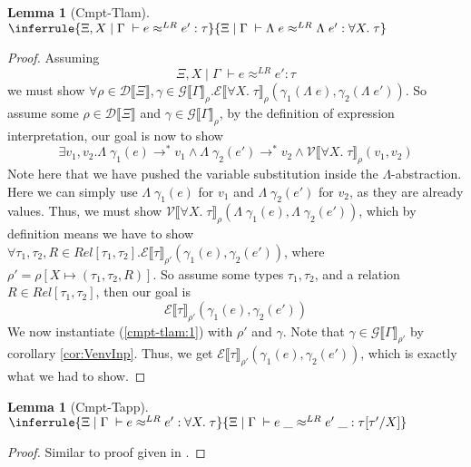 \documentclass[twoside,11pt,openright]{report}
\newtheorem{lemma}[theorem]{Lemma}
\theoremstyle{definition}
\newcommand{\expr}{e}
\newcommand{\val}{v}
\newcommand{\Tvar}{X}
\newcommand{\Tlam}{\Lambda\;}
\newcommand{\Tapp}[1]{#1\;\_}
\newcommand{\subst}[3]{#1{\left[#3 \middle/ #2 \right]}}
\newcommand{\Tall}[2]{\forall #1.\; #2}
\newcommand{\typ}{\tau}
\newcommand{\venv}{\Gamma}
\newcommand{\tenv}{\Xi}
\newcommand{\jdgRel}[6]{#1 \; | \; #2 \; \vdash #3 \approx^{#4} #5 : #6}
\newcommand{\stepS}{\rightarrow^*}
\newcommand{\ValInp}[2]{\mathcal{V} \llbracket #1 \rrbracket_{#2}}
\newcommand{\ExpInp}[2]{\mathcal{E} \llbracket #1 \rrbracket_{#2}}
\newcommand{\VenvInp}[2]{\mathcal{G} \llbracket #1 \rrbracket_{#2}}
\newcommand{\TenvInp}[1]{\mathcal{D} \llbracket #1 \rrbracket}
\newcommand{\LogRel}[5]{\jdgRel{#1}{#2}{#3}{LR}{#4}{#5}}
\newcommand{\map}[2]{#1 \mapsto #2}
\begin{document}
\begin{lemma}[Cmpt-Tlam]
  $\inferrule
  { \LogRel{\tenv, \Tvar}{\venv}{\expr}{\expr'}{\typ} }
  { \LogRel{\tenv}{\venv}{\Tlam{\expr}}{\Tlam{\expr'}}{\Tall{\Tvar}{\typ}} }$
\end{lemma}
\begin{proof}
  Assuming
  \begin{equation}\label{cmpt-tlam:1}
    \LogRel{\tenv, \Tvar}{\venv}{\expr}{\expr'}{\typ}
  \end{equation}
  we must show
  $\forall \rho \in \TenvInp{\tenv}, \gamma \in \VenvInp{\venv}{\rho} . \ExpInp{\Tall{\Tvar}{\typ}}{\rho}(\gamma_1(\Tlam{\expr}), \gamma_2(\Tlam{\expr'}))$. So assume some $\rho \in \TenvInp{\tenv}$ and $\gamma \in \VenvInp{\venv}{\rho}$, by the definition of expression interpretation, our goal is now to show
  \begin{equation}
    \exists \val_1, \val_2 . \Tlam{\gamma_1(\expr)} \stepS \val_1 \land \Tlam{\gamma_2(\expr')} \stepS \val_2 \land \ValInp{\Tall{\Tvar}{\typ}}{\rho}(\val_1, \val_2)
  \end{equation}
  Note here that we have pushed the variable substitution inside the $\Lambda$-abstraction.
  Here we can simply use $\Tlam{\gamma_1(\expr)}$ for $\val_1$ and $\Tlam{\gamma_2(\expr')}$ for $\val_2$, as they are already values. Thus, we must show $\ValInp{\Tall{\Tvar}{\typ}}{\rho}(\Tlam{\gamma_1(\expr)}, \Tlam{\gamma_2(\expr')})$, which by definition means we have to show $\forall \typ_1, \typ_2, R \in Rel[\typ_1, \typ_2] . \ExpInp{\typ}{\rho'}(\gamma_1(\expr), \gamma_2(\expr'))$, where $\rho' = \rho[\map{\Tvar}{(\typ_1, \typ_2, R)}]$. So assume some types $\typ_1, \typ_2$, and a relation $R \in Rel[\typ_1, \typ_2]$, then our goal is
  \begin{equation}\label{cmpt-tlam:goal}
    \ExpInp{\typ}{\rho'}(\gamma_1(\expr), \gamma_2(\expr'))
  \end{equation}
  We now instantiate (\ref*{cmpt-tlam:1}) with $\rho'$ and $\gamma$. Note that $\gamma \in \VenvInp{\venv}{\rho'}$ by corollary \ref{cor:VenvInp}. Thus, we get $\ExpInp{\typ}{\rho'}(\gamma_1(\expr), \gamma_2(\expr'))$, which is exactly what we had to show.
\end{proof}


\begin{lemma}[Cmpt-Tapp]
  $\inferrule
  { \LogRel{\tenv}{\venv}{\expr}{\expr'}{\Tall{\Tvar}{\typ}} }
  { \LogRel{\tenv}{\venv}{\Tapp{\expr}}{\Tapp{\expr'}}{\subst{\typ}{\Tvar}{\typ'}} }$
\end{lemma}
\begin{proof}
  Similar to proof given in \cite{DBLP:journals/corr/abs-1907-11133}.
\end{proof}
\end{document}
